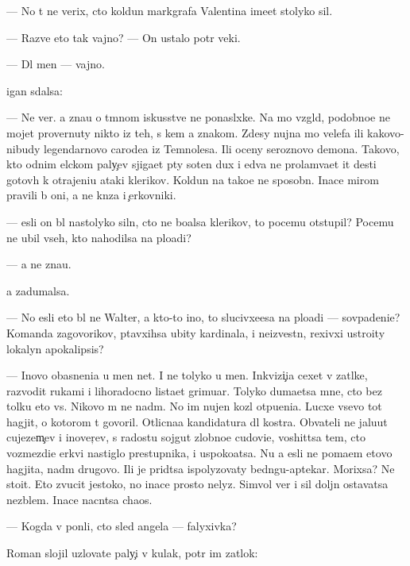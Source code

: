 \documentclass[10pt]{book}
\begin{document}
— No t{\yi} ne verix, cto koldun markgrafa Valentina ime{\y}et stolyko sil.

— Razve eto tak vajno? — On ustalo pot{\e}r veki.

— Dl{\ia} men{\ia} — vajno.

{\C}igan sdalsa:

— Ne ver{\io}. {\Y}a zna{\y}u o t{\e}mnom iskusstve ne ponasl{\yi}xke. Na mo{\y} vzgl{\ia}d, po\-dob\-no\-{\y}e ne mojet provernuty nikto iz teh, s kem {\y}a znakom. Zdesy nujna mo{\x} velefa ili kakovo-nibudy legendarnovo carode{\y}a iz Temnoles{\y}a. Ili oceny ser{\y}oznovo demona. Takovo, kto odnim {\x}elckom paly{\c}ev sjiga{\y}et p{\ia}ty soten dux i {\y}edva ne prolam{\yi}va{\y}et {\x}it des{\ia}ti gotov{\yi}h k otrajeni{\y}u ataki klerikov. Koldun{\yi} na tako{\y}e ne sposobn{\yi}. Inace mirom pravili b{\yi} oni, a ne kn{\ia}z{\y}a i {\c}erkovniki.

— {\Y}esli on b{\yi}l nastolyko sil{\e}n, cto ne bo{\y}alsa klerikov, to pocemu otstupil? Po\-ce\-mu ne ubil vseh, kto nahodilsa na plo{\x}adi?

— {\Y}a ne zna{\y}u.

{\Y}a zadumalsa.

— No {\y}esli eto b{\yi}l ne Walter, a kto-to ino{\y}, to slucivxe{\y}esa na plo{\x}adi — sovpadeni{\y}e? Komanda zagovor{\x}ikov, p{\yi}tavxihsa ubity kardinala, i neizvestn{\yi}{\y}, re\-xiv\-xi{\y} ustro{\y}ity lokalyn{\yi}{\y} apokalipsis?

— Inovo ob{\y}asneni{\y}a u men{\ia} net. I ne tolyko u men{\ia}. Inkvizi{\c}i{\y}a cexet v za\-t{\yi}l\-ke, razvodit rukami i lihoradocno lista{\y}et grimuar{\yi}. Tolyko duma{\y}etsa mne, cto bez tolku eto vs{\e}. Nikovo m{\yi} ne na{\y}d{\e}m. No im nujen koz{\e}l otpu{\x}eni{\y}a. Lucxe vsevo tot hagjit, o kotorom t{\yi} govoril. Otlicna{\y}a kandidatura dl{\ia} kostra. Ob{\yi}vateli ne jalu{\y}ut cujezem{\c}ev i inover{\c}ev, s radost{\y}u sojgut zlobno{\y}e cudovi{\x}e, voshit{\ia}tsa tem, cto vozmezdi{\y}e {\C}erkvi nastiglo prestupnika, i uspoko{\y}atsa. Nu a {\y}esli ne po{\y}ma{\y}em etovo hagjita, na{\y}d{\e}m drugovo. Ili je prid{\e}tsa ispolyzovaty bedn{\ia}gu-aptekar{\ia}. Mor\-{\x}ixsa? Ne stoit. Eto zvucit jestoko, no inace prosto nelyz{\ia}. Simvol{\yi} ver{\yi} i sil{\yi} doljn{\yi} ostavatsa nez{\yi}blem{\yi}. Inace nacn{\e}tsa chaos.

— Kogda v{\yi} pon{\ia}li, cto sled angela — falyxivka?

Roman slojil uzlovat{\yi}{\y}e paly{\c}i v kulak, pot{\e}r im zat{\yi}lok:
\end{document}
